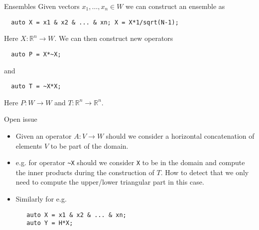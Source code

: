 \documentclass[9pt]{beamer}
\begin{document}
\begin{frame}[fragile]{Ensembles}
  Given vectors $x_1, \ldots , x_n \in W $ we can construct an ensemble as

\begin{lstlisting}
  auto X = x1 & x2 & ... & xn; X = X*1/sqrt(N-1);
\end{lstlisting}
Here $X\colon\mathbb{R}^n \rightarrow W$. We can then construct new operators

\begin{lstlisting}
  auto P = X*~X;
\end{lstlisting}

and

\begin{lstlisting}
  auto T = ~X*X;
\end{lstlisting}
Here $P\colon W \to W$ and  $T\colon \mathbb{R}^n \rightarrow \mathbb{R}^n$. 

\pause

Open issue 
\begin{itemize}
 \item Given an operator $A: V \rightarrow W$ should we consider a horizontal concatenation of elements  $V$ to be part of the domain. 
 \item e.g. for operator \lstinline|~X| should we consider \lstinline|X| to be in the domain and compute the inner products during the construction of $T$. How to detect that we only need to compute the upper/lower triangular part in this case.
 \item Similarly for e.g. 
   \begin{lstlisting} 
   auto X = x1 & x2 & ... & xn; 
   auto Y = H*X; 
   \end{lstlisting}   
  \end{itemize} 
\end{frame}
\end{document}
